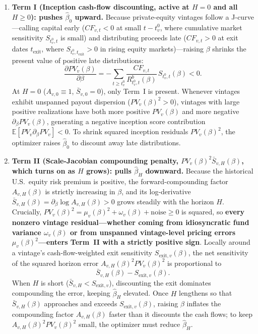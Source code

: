 \documentclass[11pt]{article}
\newcommand{\E}{\mathbb{E}}
\theoremstyle{plain}
\theoremstyle{definition}
\begin{document}
\begin{enumerate}
\item \textbf{Term I (Inception cash-flow discounting, active at $H=0$ and all $H\ge 0$): pushes $\hat\beta_0$ upward.}
Because private-equity vintages follow a J-curve---calling capital early ($CF_{v,t}<0$ at small $t-t_v^0$, where cumulative market sensitivity $S_{t_v^0,t}$ is small) and distributing proceeds late ($CF_{v,t}>0$ at exit dates $t_{\mathrm{exit}}$, where $S_{t_v^0,t_{\mathrm{exit}}}>0$ in rising equity markets)---raising $\beta$ shrinks the present value of positive late distributions:
\[
\frac{\partial PV_v(\beta)}{\partial\beta}=-\sum_{t\ge t_v^0}\frac{CF_{v,t}}{R^b_{t_v^0,t}(\beta)}\,S_{t_v^0,t}(\beta)<0.
\]
At $H=0$ ($A_{v,0}\equiv 1$, $\bar S_{v,0}=0$), only Term~I is present. Whenever vintages exhibit unspanned payout dispersion ($PV_v(\beta)^2>0$), vintages with large positive realizations have both more positive $PV_v(\beta)$ and more negative $\partial_\beta PV_v(\beta)$, generating a negative inception score contribution $\E[PV_v\partial_\beta PV_v]<0$. To shrink squared inception residuals $PV_v(\beta)^2$, the optimizer raises $\hat\beta_0$ to discount away late distributions.

\item \textbf{Term II (Scale-Jacobian compounding penalty, $PV_v(\beta)^2\bar S_{v,H}(\beta)$, which turns on as $H$ grows): pulls $\hat\beta_H$ downward.}
Because the historical U.S.\ equity risk premium is positive, the forward-compounding factor $A_{v,H}(\beta)$ is strictly increasing in $\beta$, and its log-derivative $\bar S_{v,H}(\beta)=\partial_\beta\log A_{v,H}(\beta)>0$ grows steadily with the horizon $H$. Crucially, $PV_v(\beta)^2=\mu_v(\beta)^2+\omega_v(\beta)+\text{noise}\ge 0$ is squared, so \textbf{every nonzero vintage residual---whether coming from idiosyncratic fund variance $\omega_v(\beta)$ or from unspanned vintage-level pricing errors $\mu_v(\beta)^2$---enters Term~II with a strictly positive sign}. Locally around a vintage's cash-flow-weighted exit sensitivity $S_{\mathrm{exit},v}(\beta)$, the net sensitivity of the squared horizon error $A_{v,H}(\beta)^2 PV_v(\beta)^2$ is proportional to
\[
\bar S_{v,H}(\beta)-S_{\mathrm{exit},v}(\beta).
\]
When $H$ is short ($\bar S_{v,H}<S_{\mathrm{exit},v}$), discounting the exit dominates compounding the error, keeping $\hat\beta_H$ elevated. Once $H$ lengthens so that $\bar S_{v,H}(\beta)$ approaches and exceeds $S_{\mathrm{exit},v}(\beta)$, raising $\beta$ inflates the compounding factor $A_{v,H}(\beta)$ faster than it discounts the cash flows; to keep $A_{v,H}(\beta)^2 PV_v(\beta)^2$ small, the optimizer must reduce $\hat\beta_H$.
\end{enumerate}
\end{document}
